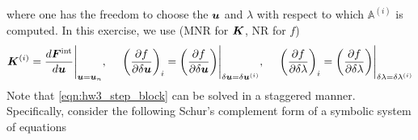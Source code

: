 where one has the freedom to choose the $\bm{u}$ and $\lambda$ with respect to which $\mathbb{A}^{(i)}$ is computed. 
In this exercise, we use (MNR for $\bm{K}$, NR for $f$)
\begin{equation}
    \bm{K}^{(i)} = \frac{d\bm{F}^{\textrm{int}}}{d\bm{u}}\Bigg|_{\bm{u} = \bm{u}_n}, ~~~~ 
    {\left(\frac{\partial f}{\partial \delta \bm{u}}\right)}_i = {\left(\frac{\partial f}{\partial \delta \bm{u}}\right)}\Bigg|_{\delta \bm{u} = \delta \bm{u}^{(i)}}, ~~~~
    {\left(\frac{\partial f}{\partial \delta \lambda}\right)}_i = {\left(\frac{\partial f}{\partial \delta \lambda}\right)}\Bigg|_{\delta \lambda = \delta \lambda^{(i)}}
\end{equation}
Note that \cref{eqn:hw3_step_block} can be solved in a staggered manner. 
Specifically, consider the following Schur's complement form of a symbolic system of equations
